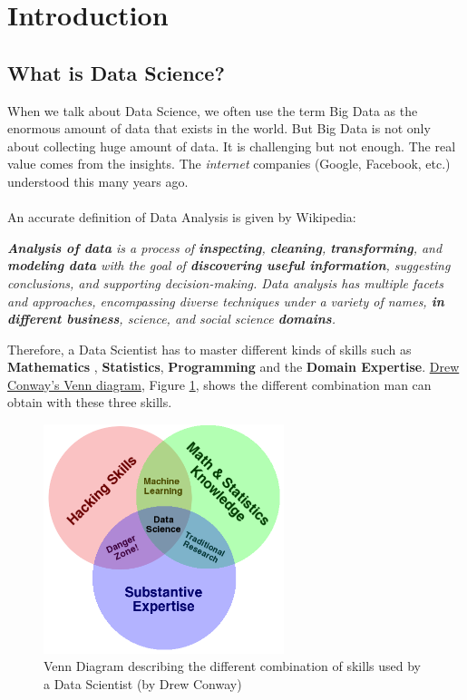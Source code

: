 \clearpage

\section{Introduction}

\subsection{What is Data Science?}

When we talk about Data Science, we often use the term Big Data as the enormous amount of data that exists in the world. But Big Data is not only about collecting huge amount of data. It is challenging but not enough. The real value comes from the insights. The {\it internet} companies (Google, Facebook, etc.) 
understood this many years ago.
\\ \\
An accurate definition of Data Analysis is given by Wikipedia:
\begin{framed}
{\it {\bf Analysis of data} is a process of {\bf inspecting}, {\bf cleaning}, {\bf transforming}, and {\bf modeling data} with the goal of {\bf discovering useful information}, suggesting conclusions, and supporting decision-making.
Data analysis has multiple facets and approaches, encompassing diverse techniques under a variety of names, {\bf in different business}, science, and social science {\bf domains}.}
\end{framed}

Therefore, a Data Scientist has to master different kinds of skills such as {\bf Mathematics} , {\bf Statistics}, {\bf Programming} and the {\bf Domain Expertise}. \href{http://videolectures.net/kdd2014\_conway\_social\_science/}{Drew Conway's Venn diagram}, Figure \ref{img:venn}, shows the different combination man can obtain with these three skills.

\begin{figure}[H]
 \centering
 \includegraphics[width=7cm]{./img/01/Data_Science_VD.png}
 \caption{\label{img:venn} Venn Diagram describing the different combination of skills used by a Data Scientist (by Drew Conway)} 
\end{figure}

